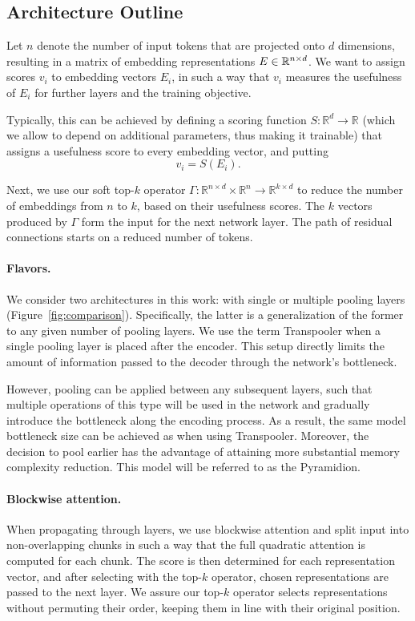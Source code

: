 \documentclass{article}
\begin{document}
\subsection{Architecture Outline}
Let $n$ denote the number of input tokens that are projected onto $d$ dimensions, resulting in a matrix of embedding representations $\mathnormal{E \in \mathbb{R}^{n\times d}}$. We want to assign scores $v_{i}$ to embedding vectors $E_{i}$, in such a way that $v_{i}$ measures the usefulness of $E_{i}$ for further layers and the training objective.

Typically, this can be achieved by defining a scoring function $S\colon \mathbb{R}^{d} \to \mathbb{R}$ (which we allow to depend on additional parameters, thus making it trainable) that assigns a usefulness score to every embedding vector, and putting
\begin{equation}
  v_{i} = S(E_{i}).
\end{equation}


Next, we use our soft top-$k$ operator $\Gamma\colon \mathbb{R}^{n \times d} \times \mathbb{R}^{n} \to \mathbb{R}^{k \times d}$ to reduce the number of embeddings from $n$ to $k$, based on their usefulness scores. The $k$ vectors produced by $\Gamma$ form the input for the next network layer. The path of residual connections starts on a reduced number of tokens.

\paragraph{Flavors.} We consider two architectures in this work: with single or multiple pooling layers (Figure~\ref{fig:comparison}). Specifically, the latter is a generalization of the former to any given number of pooling layers. We use the term Transpooler when a single pooling layer is placed after the encoder. This setup directly limits the amount of information passed to the decoder through the network's bottleneck.

However, pooling can be applied between any subsequent layers, such that multiple operations of this type will be used in the network and gradually introduce the bottleneck along the encoding process. As a result, the same model bottleneck size can be achieved as when using Transpooler. Moreover, the decision to pool earlier has the advantage of attaining more substantial memory complexity reduction. This model will be referred to as the Pyramidion.

\paragraph{Blockwise attention.}
When propagating through layers, we use blockwise attention and split input into non-overlapping chunks in such a way that the full quadratic attention is computed for each chunk. The score is then determined for each representation vector, and after selecting with the top-$k$ operator, chosen representations are passed to the next layer. We assure our top-$k$ operator selects representations without permuting their order, keeping them in line with their original position. 
\end{document}
